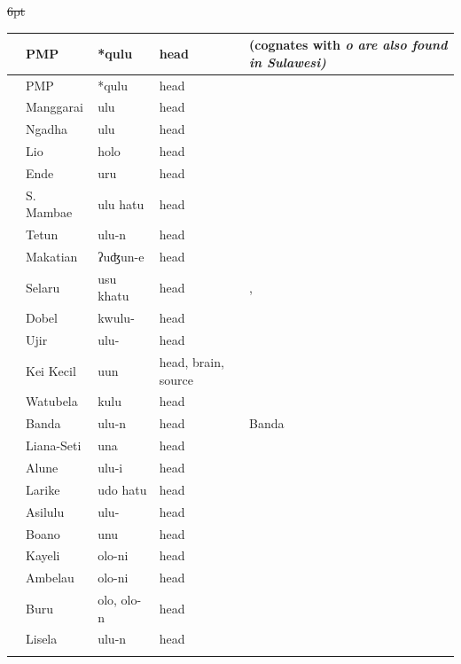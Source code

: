 {\st{6pt}\begin{xltabular}[l]{\linewidth}
{>{\hspace{-\tabcolsep}}l<{\hspace{-\tabcolsep}}
>{\hspace{-\tabcolsep}\enspace}lll
>{\raggedright\arraybackslash}X}
\lsptoprule
{}	&	PMP	&	*qulu	&	head	&	(cognates with \it{o} are also found in Sulawesi)	\\	\midrule
\endfirsthead
\lsptoprule
{}	&	PMP	&	*qulu	&	head	&		\\	\midrule
\endhead
	&	Manggarai	&	ulu	&	head	&		\\
	&	Ngadha	&	ulu	&	head	&		\\
\rcl	&	Lio	&	holo	&	head	&		\\
	&	Ende	&	uru	&	head	&		\\
	&	S. Mambae	&	ulu hatu	&	head	&		\\
	&	Tetun	&	ulu-n	&	head	&		\\
	&	Makatian	&	ʔuʤun-e	&	head	&		\\
	&	Selaru	&	usu khatu	&	head	&	, 	\\
	&	Dobel	&	kwulu-	&	head	&		\\
	&	Ujir	&	ulu-	&	head	&		\\
	&	Kei Kecil	&	uun	&	head, brain, source	&		\\
	&	Watubela	&	kulu	&	head	&		\\
	&	Banda	&	ulu-n	&	head	&	Banda	\\
	&	Liana-Seti	&	una	&	head	&		\\
	&	Alune	&	ulu-i	&	head	&		\\
\rcl	&	Larike	&	udo hatu	&	head	&		\\
	&	Asilulu	&	ulu-	&	head	&		\\
	&	Boano	&	unu	&	head	&		\\
\rcl	&	Kayeli	&	olo-ni	&	head	&		\\
\rcl	&	Ambelau	&	olo-ni	&	head	&		\\
\rcl	&	Buru	&	olo, olo-n	&	head	&		\\
	&	Lisela	&	ulu-n	&	head	&		\\
\lspbottomrule
\end{xltabular}\addtocounter{table}{-1}}

